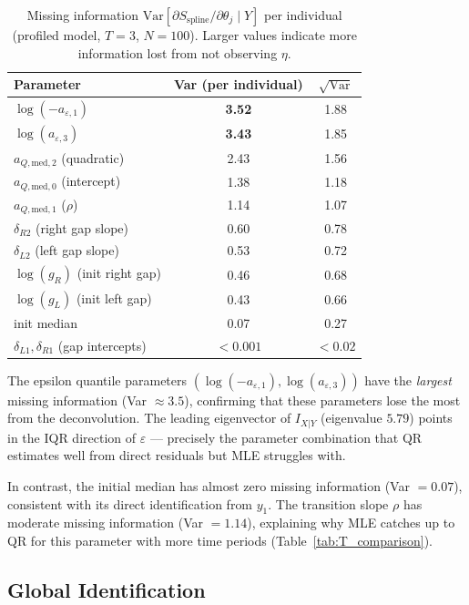 \documentclass[12pt]{article}
\begin{document}
\begin{table}[H]
\centering
\caption{Missing information $\text{Var}[\partial S_{\text{spline}}/\partial\theta_j \mid Y]$
per individual (profiled model, $T = 3$, $N = 100$).
Larger values indicate more information lost from not observing $\eta$.}
\label{tab:missing_info}
\begin{tabular}{lcc}
\toprule
Parameter & Var (per individual) & $\sqrt{\text{Var}}$ \\
\midrule
$\log(-a_{\varepsilon,1})$ & \textbf{3.52} & 1.88 \\
$\log(a_{\varepsilon,3})$  & \textbf{3.43} & 1.85 \\
$a_{Q,\text{med},2}$ (quadratic) & 2.43 & 1.56 \\
$a_{Q,\text{med},0}$ (intercept) & 1.38 & 1.18 \\
$a_{Q,\text{med},1}$ ($\rho$) & 1.14 & 1.07 \\
$\delta_{R2}$ (right gap slope) & 0.60 & 0.78 \\
$\delta_{L2}$ (left gap slope) & 0.53 & 0.72 \\
$\log(g_R)$ (init right gap) & 0.46 & 0.68 \\
$\log(g_L)$ (init left gap) & 0.43 & 0.66 \\
init median & 0.07 & 0.27 \\
$\delta_{L1}, \delta_{R1}$ (gap intercepts) & $< 0.001$ & $< 0.02$ \\
\bottomrule
\end{tabular}
\end{table}

The epsilon quantile parameters $(\log(-a_{\varepsilon,1}), \log(a_{\varepsilon,3}))$
have the \emph{largest} missing information (Var $\approx 3.5$), confirming
that these parameters lose the most from the deconvolution.
The leading eigenvector of $I_{X|Y}$ (eigenvalue $5.79$) points in the
IQR direction of $\varepsilon$ --- precisely the parameter combination
that QR estimates well from direct residuals but MLE struggles with.

In contrast, the initial median has almost zero missing information
(Var $= 0.07$), consistent with its direct identification from $y_1$.
The transition slope $\rho$ has moderate missing information (Var $= 1.14$),
explaining why MLE catches up to QR for this parameter with more time periods
(Table~\ref{tab:T_comparison}).

\subsection{Global Identification}
\end{document}

